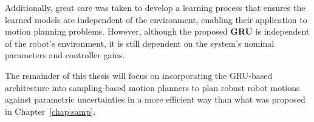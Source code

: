 Additionally, great care was taken to develop a learning process that ensures the learned models are independent of the environment, enabling their application to motion planning problems. 
However, although the proposed \textbf{GRU} is independent of the robot's environment, it is still dependent on the system's nominal parameters and controller gains.

The remainder of this thesis will focus on incorporating the GRU-based architecture into sampling-based motion planners to plan robust robot motions against parametric uncertainties in a more efficient way than what was proposed in Chapter~\ref{chap:samp}.
